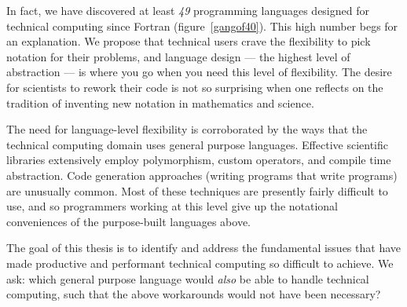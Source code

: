In fact, we have discovered at least \emph{49} programming languages
designed for technical computing since Fortran (figure~\ref{gangof40}).
This high number begs for an explanation.
We propose that technical users crave the flexibility to pick notation
for their problems, and language design --- the highest level of
abstraction --- is where you go when you need this level of flexibility.
The desire for scientists to rework their code is not so surprising when one reflects
on the tradition of inventing new notation in mathematics and science.

The need for language-level flexibility is corroborated by
the ways that the technical computing domain uses general purpose
languages.
Effective scientific libraries extensively employ
polymorphism, custom operators, and compile time abstraction.
Code generation approaches (writing programs that write programs)
are unusually common.
Most of these techniques are presently fairly difficult to use, and so
programmers working at this level give up the notational conveniences
of the purpose-built languages above.

The goal of this thesis is to identify and address the fundamental
issues that have made productive and performant technical computing
so difficult to achieve.
We ask: which general purpose language would \emph{also} be able to handle
technical computing, such that the above workarounds would not have
been necessary?


\iffalse
Compiler techniques, library design, high-performance
computational kernels, new algorithms, and approaches to parallelism are
all important to technical computing.
However these sorts of technologies can usually be applied to multiple
languages, as has happened in the C and Fortran language families.
However in conjunction with a new language, these technologies can flourish.
Indeed, we believe that language design
has reached a level of importance that even (perhaps temporarily) supersedes
the traditional focus of cache utilization and the use of matrix operations.
\fi

